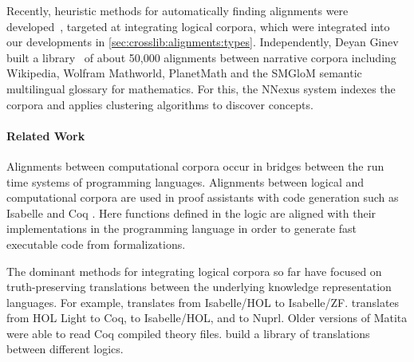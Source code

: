 %
Recently, heuristic methods for automatically finding
alignments were developed~\cite{tgck-cicm14}, targeted at integrating logical corpora, which were 
integrated into our developments in \autoref{sec:crosslib:alignments:types}.
%
Independently, Deyan Ginev built a library~\cite{GinCor:nnexus:14} of about
50,000 alignments between narrative corpora including Wikipedia, Wolfram Mathworld,
PlanetMath and the SMGloM semantic multilingual glossary for mathematics. For this,
the NNexus system indexes the corpora and applies clustering algorithms to discover
concepts.

\paragraph{Related Work}
Alignments between computational corpora occur in bridges between the run time systems of programming languages.
Alignments between logical and computational corpora are used in proof assistants with code generation such as Isabelle \cite{WLPN:TIF} and Coq \cite{coq}.
Here functions defined in the logic are aligned with their implementations in the programming language in order to generate fast executable code from formalizations.

The dominant methods for integrating logical corpora so far have focused on truth-preserving translations between the underlying knowledge representation languages.
For example, \cite{isahol_isazf} translates from Isabelle/HOL to Isabelle/ZF.
\cite{hol_coq} translates from HOL Light to Coq, \cite{hol_isahol} to Isabelle/HOL, and \cite{hol_nuprl} to Nuprl.
Older versions of Matita \cite{matita} were able to read Coq compiled theory files.
\cite{CHKMR:latinabs:11} build a library of translations between different logics.

